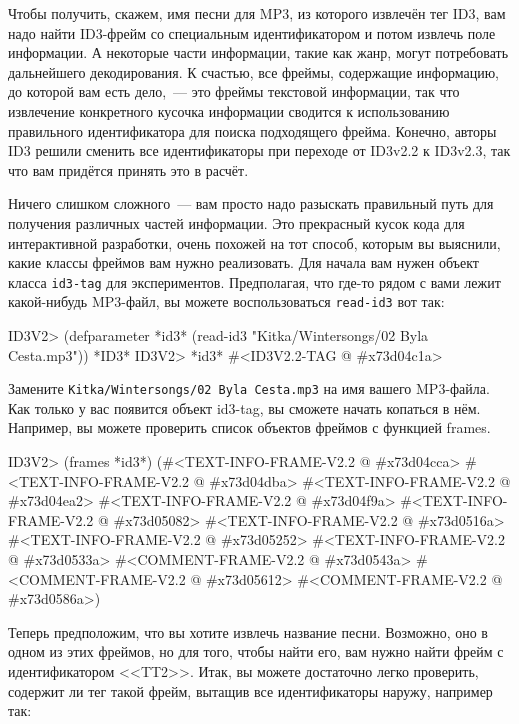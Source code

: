Чтобы получить, скажем, имя песни для MP3, из которого извлечён тег ID3, вам надо найти
ID3-фрейм со специальным идентификатором и потом извлечь поле информации. А некоторые
части информации, такие как жанр, могут потребовать дальнейшего декодирования. К счастью,
все фреймы, содержащие информацию, до которой вам есть дело,~--- это фреймы текстовой
информации, так что извлечение конкретного кусочка информации сводится к использованию
правильного идентификатора для поиска подходящего фрейма. Конечно, авторы ID3 решили
сменить все идентификаторы при переходе от ID3v2.2 к ID3v2.3, так что вам придётся принять
это в расчёт.

Ничего слишком сложного~--- вам просто надо разыскать правильный путь для получения
различных частей информации. Это прекрасный кусок кода для интерактивной разработки, очень
похожей на тот способ, которым вы выяснили, какие классы фреймов вам нужно
реализовать. Для начала вам нужен объект класса \lstinline{id3-tag} для экспериментов. Предполагая,
что где-то рядом с вами лежит какой-нибудь MP3-файл, вы можете воспользоваться \lstinline{read-id3}
вот так:

\begin{myverb}
ID3V2> (defparameter *id3* (read-id3 "Kitka/Wintersongs/02 Byla Cesta.mp3"))
*ID3*
ID3V2> *id3*
#<ID3V2.2-TAG @ #x73d04c1a>
\end{myverb}

Замените \texttt{Kitka/Wintersongs/02 Byla Cesta.mp3} на имя вашего MP3-файла. Как только
у вас появится объект id3-tag, вы сможете начать копаться в нём. Например, вы можете
проверить список объектов фреймов с функцией frames.

\begin{myverb}
ID3V2> (frames *id3*)
(#<TEXT-INFO-FRAME-V2.2 @ #x73d04cca>
 #<TEXT-INFO-FRAME-V2.2 @ #x73d04dba>
 #<TEXT-INFO-FRAME-V2.2 @ #x73d04ea2>
 #<TEXT-INFO-FRAME-V2.2 @ #x73d04f9a>
 #<TEXT-INFO-FRAME-V2.2 @ #x73d05082>
 #<TEXT-INFO-FRAME-V2.2 @ #x73d0516a>
 #<TEXT-INFO-FRAME-V2.2 @ #x73d05252>
 #<TEXT-INFO-FRAME-V2.2 @ #x73d0533a>
 #<COMMENT-FRAME-V2.2 @ #x73d0543a>
 #<COMMENT-FRAME-V2.2 @ #x73d05612>
 #<COMMENT-FRAME-V2.2 @ #x73d0586a>)
\end{myverb}

Теперь предположим, что вы хотите извлечь название песни. Возможно, оно в одном из этих
фреймов, но для того, чтобы найти его, вам нужно найти фрейм с идентификатором
<<TT2>>. Итак, вы можете достаточно легко проверить, содержит ли тег такой фрейм, вытащив
все идентификаторы наружу, например так:


